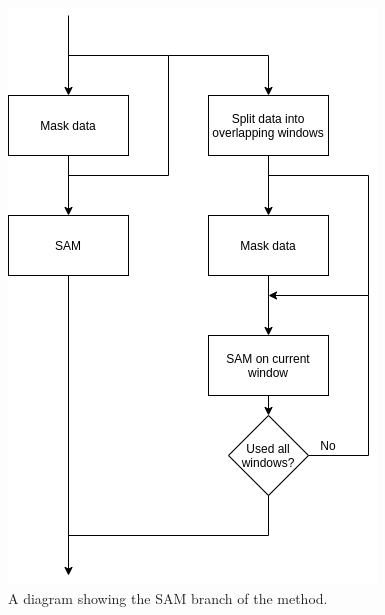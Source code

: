                 \begin{figure}
                    \centering
                    
                    \includegraphics[width=0.9\linewidth]{figures/pca_data_driven_surrogate_signal_extraction_methods_for_dynamic_pet_methods_data_driven_surrogate_signal_extraction_sam.png}
                    
                    \captionsetup{singlelinecheck=false, justification=centering}
                    \caption{A diagram showing the \gls{SAM} branch of the method.}
                    \label{fig:pca_data_driven_surrogate_signal_extraction_methods_for_dynamic_pet_methods_data_driven_surrogate_signal_extraction_sam}
                \end{figure}
                

